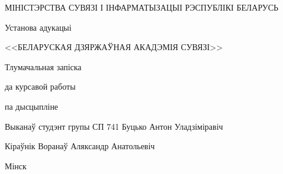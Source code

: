 \begin{TitlePage}
    МІНІСТЭРСТВА СУВЯЗІ І ІНФАРМАТЫЗАЦЫІ РЭСПУБЛІКІ БЕЛАРУСЬ

    Установа адукацыі

    <<БЕЛАРУСКАЯ ДЗЯРЖАЎНАЯ АКАДЭМІЯ СУВЯЗІ>>

    \faculty{\telecommunication}

    \department{\software}

    \vspace{5cm}
    

    \vspace{\baselineskip}

    Тлумачальная запіска

    да курсавой работы

    па дысцыпліне

    
    \vspace{6.5cm}

    Выканаў студэнт групы СП 741 \hfill Буцько Антон Уладзіміравіч

    \vspace{\baselineskip}

    Кіраўнік \hfill Воранаў Аляксандр Анатольевіч

    \vfill

    Мінск \the\year
\end{TitlePage}
